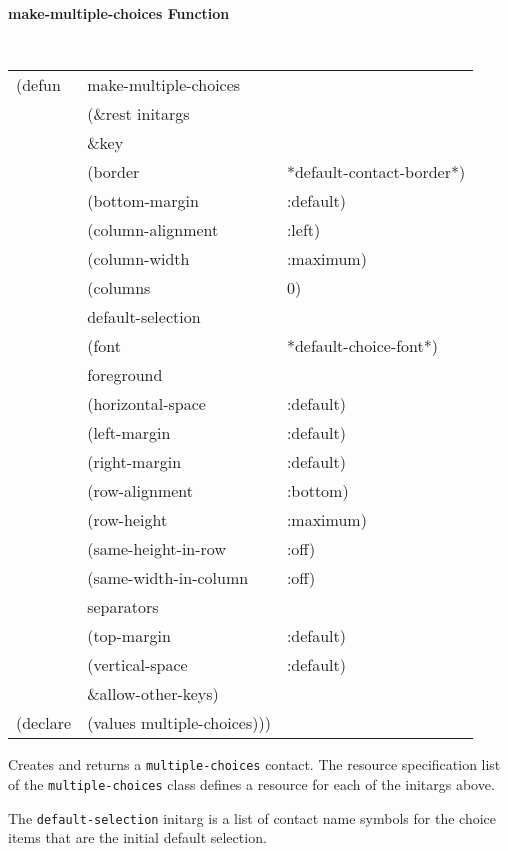 {\samepage

{\large {\bf make-multiple-choices \hfill Function}}
\label{page:make-multiple-choices} 
\begin{flushright} \parbox[t]{6.125in}{
\tt
\begin{tabular}{lll}
\raggedright
(defun & make-multiple-choices \\
       & (\&rest initargs \\
       & \&key  \\ 
       & (border                & *default-contact-border*) \\ 
       & (bottom-margin         & :default) \\
       & (column-alignment      & :left)\\
       & (column-width          & :maximum)\\
       & (columns               & 0)\\
       & default-selection & \\
       & (font                  & *default-choice-font*)\\       
       & foreground \\
       & (horizontal-space      & :default) \\
       & (left-margin           & :default) \\
       & (right-margin          & :default) \\
       & (row-alignment         & :bottom)\\
       & (row-height            & :maximum)\\
       & (same-height-in-row    & :off)\\
       & (same-width-in-column  & :off)\\
       & separators  & \\
       & (top-margin            & :default) \\
       & (vertical-space        & :default) \\
       & \&allow-other-keys) \\
(declare & (values   multiple-choices)))
\end{tabular}
\rm

}\end{flushright}}

\begin{flushright} \parbox[t]{6.125in}{
Creates and returns a {\tt multiple-choices} contact.
The resource specification list of the {\tt multiple-choices} class defines
a resource for each of the initargs above.

The {\tt default-selection} initarg is a list of contact name symbols for the
choice items that are the initial default selection.


}\end{flushright}

